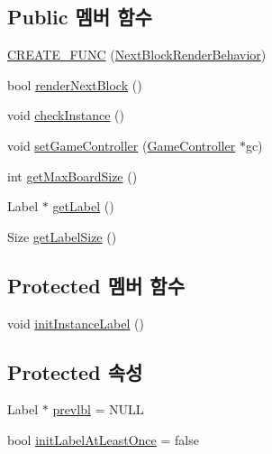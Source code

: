 \subsection*{Public 멤버 함수}
\begin{DoxyCompactItemize}
\item 
\hyperlink{class_tetris_1_1_views_1_1_next_block_render_behavior_a34915309c31047bd6d7244ed7002edd1}{C\+R\+E\+A\+T\+E\+\_\+\+F\+U\+NC} (\hyperlink{class_tetris_1_1_views_1_1_next_block_render_behavior}{Next\+Block\+Render\+Behavior})
\item 
bool \hyperlink{class_tetris_1_1_views_1_1_next_block_render_behavior_aa9240528e0603ca129d7877f9e71b27d}{render\+Next\+Block} ()
\item 
void \hyperlink{class_tetris_1_1_views_1_1_next_block_render_behavior_a5593a27688fa599f7315c48ee0a0dfb6}{check\+Instance} ()
\item 
void \hyperlink{class_tetris_1_1_views_1_1_next_block_render_behavior_a35709270c896ca2a21266b52727412ae}{set\+Game\+Controller} (\hyperlink{class_tetris_1_1_game_controller}{Game\+Controller} $\ast$gc)
\item 
int \hyperlink{class_tetris_1_1_views_1_1_next_block_render_behavior_aa1d5fbc45ec963fa86fff0f73359d028}{get\+Max\+Board\+Size} ()
\item 
Label $\ast$ \hyperlink{class_tetris_1_1_views_1_1_next_block_render_behavior_abcabe24356de7c9a512ea3a1b3d9b1bf}{get\+Label} ()
\item 
Size \hyperlink{class_tetris_1_1_views_1_1_next_block_render_behavior_a5eb782a4171baf98f967d5a048cfe243}{get\+Label\+Size} ()
\end{DoxyCompactItemize}
\subsection*{Protected 멤버 함수}
\begin{DoxyCompactItemize}
\item 
void \hyperlink{class_tetris_1_1_views_1_1_next_block_render_behavior_a71f46d8714e29a672ae20b0af5f4db2e}{init\+Instance\+Label} ()
\end{DoxyCompactItemize}
\subsection*{Protected 속성}
\begin{DoxyCompactItemize}
\item 
Label $\ast$ \hyperlink{class_tetris_1_1_views_1_1_next_block_render_behavior_afc0dbfd7dbdf66e88a804a109b470546}{prevlbl} = N\+U\+LL
\item 
bool \hyperlink{class_tetris_1_1_views_1_1_next_block_render_behavior_ab0185d337e0b137ed985aeebef5f3b43}{init\+Label\+At\+Least\+Once} = false
\end{DoxyCompactItemize}
